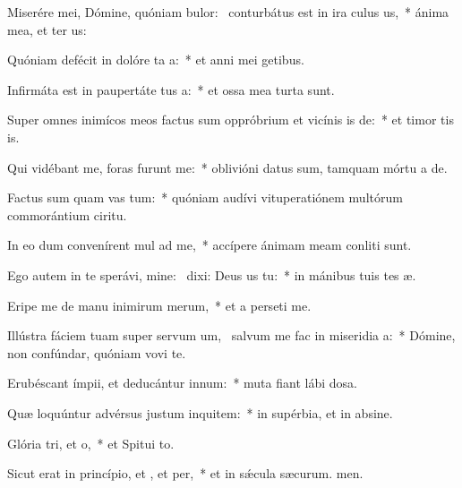 \item Miserére mei, Dómine, quóniam bulor:~\pscross{} conturbátus est in ira culus us,~* ánima mea, et ter us:
\item Quóniam defécit in dolóre ta a:~* et anni mei  getibus.
\item Infirmáta est in paupertáte tus a:~* et ossa mea turta sunt.
\item Super omnes inimícos meos factus sum oppróbrium et vicínis is de:~* et timor tis is.
\item Qui vidébant me, foras furunt  me:~* oblivióni datus sum, tamquam mórtu a de.
\item Factus sum quam vas tum:~* quóniam audívi vituperatiónem multórum commorántium  ciritu.
\item In eo dum convenírent mul ad me,~* accípere ánimam meam conliti sunt.
\item Ego autem in te sperávi, mine:~\pscross{} dixi: Deus us  tu:~* in mánibus tuis tes æ.
\item Eripe me de manu inimirum merum,~* et a perseti me.
\item Illústra fáciem tuam super servum um,~\pscross{} salvum me fac in miseridia a:~* Dómine, non confúndar, quóniam vovi te.
\item Erubéscant ímpii, et deducántur  innum:~* muta fiant lábi dosa.
\item Quæ loquúntur advérsus justum inquitem:~* in supérbia, et in absine.
\item Glória tri, et o,~* et Spitui to.
\item Sicut erat in princípio, et , et per,~* et in sǽcula sæcurum. men.
